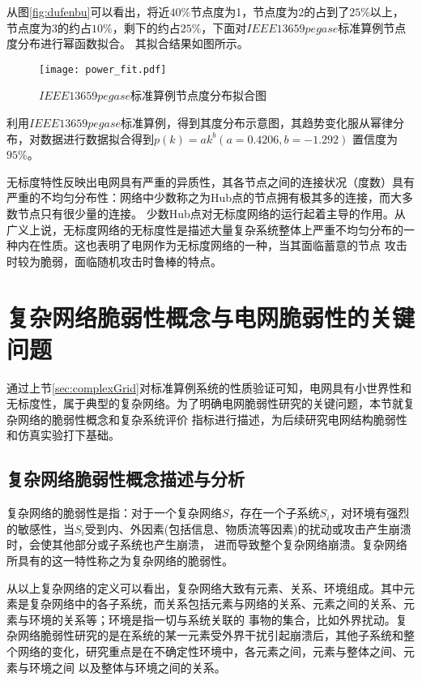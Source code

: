 从图\ref{fig:dufenbu}可以看出，将近$40\%$节点度为1，节点度为2的占到了$25\%$以上，节点度为3的约占$10\%$，剩下的约占$25\%$，下面对$IEEE13659pegase$标准算例节点度分布进行幂函数拟合。
其拟合结果如图所示。
\begin{figure}[H] %
  \centering
  \texttt{[image: power\_fit.pdf]}
  \caption{$IEEE13659pegase$标准算例节点度分布拟合图}
  \label{fig:fower_fit}
\end{figure}

利用$IEEE13659pegase$标准算例，得到其度分布示意图，其趋势变化服从幂律分布，对数据进行数据拟合得到$p(k)=a k^{b}(a=0.4206, b=-1.292)$ 置信度为$95\%$。

无标度特性反映出电网具有严重的异质性，其各节点之间的连接状况（度数）具有严重的不均匀分布性：网络中少数称之为Hub点的节点拥有极其多的连接，而大多数节点只有很少量的连接。
少数Hub点对无标度网络的运行起着主导的作用。从广义上说，无标度网络的无标度性是描述大量复杂系统整体上严重不均匀分布的一种内在性质。这也表明了电网作为无标度网络的一种，当其面临蓄意的节点
攻击时较为脆弱，面临随机攻击时鲁棒的特点。

\section{复杂网络脆弱性概念与电网脆弱性的关键问题}
\label{sec:load}
通过上节\ref{sec:complexGrid}对标准算例系统的性质验证可知，电网具有小世界性和无标度性，属于典型的复杂网络。为了明确电网脆弱性研究的关键问题，本节就复杂网络的脆弱性概念和复杂系统评价
指标进行描述，为后续研究电网结构脆弱性和仿真实验打下基础。

\subsection{复杂网络脆弱性概念描述与分析}
\label{sec:loadEffect}
复杂网络的脆弱性是指：对于一个复杂网络$S$，存在一个子系统$S_i$，对环境有强烈的敏感性，当$S_i$受到内、外因素(包括信息、物质流等因素)的扰动或攻击产生崩溃时，会使其他部分或子系统也产生崩溃，
进而导致整个复杂网络崩溃\cite{refs31}。复杂网络所具有的这一特性称之为复杂网络的脆弱性。

从以上复杂网络的定义可以看出，复杂网络大致有元素、关系、环境组成。其中元素是复杂网络中的各子系统，而关系包括元素与网络的关系、元素之间的关系、元素与环境的关系等；环境是指一切与系统关联的
事物的集合，比如外界扰动。复杂网络脆弱性研究的是在系统的某一元素受外界干扰引起崩溃后，其他子系统和整个网络的变化，研究重点是在不确定性环境中，各元素之间，元素与整体之间、元素与环境之间
以及整体与环境之间的关系。

